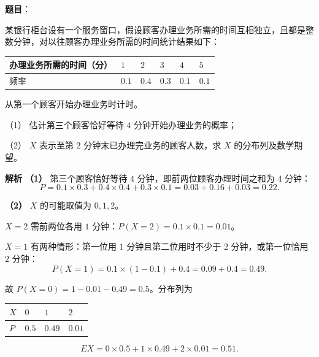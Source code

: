 \begin{answer}

\textbf{题目}：

某银行柜台设有一个服务窗口，假设顾客办理业务所需的时间互相独立，且都是整数分钟，对以往顾客办理业务所需的时间统计结果如下：

\begin{center}
\begin{tabular}{llllll}
\toprule
办理业务所需的时间（分） & $1$ & $2$ & $3$ & $4$ & $5$ \\
\midrule
频率 & $0.1$ & $0.4$ & $0.3$ & $0.1$ & $0.1$ \\
\bottomrule
\end{tabular}
\end{center}

从第一个顾客开始办理业务时计时。

（1） 估计第三个顾客恰好等待 $4$ 分钟开始办理业务的概率；

（2） $X$ 表示至第 $2$ 分钟末已办理完业务的顾客人数，求 $X$ 的分布列及数学期望。

\textbf{解析}
\textbf{（1）} 第三个顾客恰好等待 $4$ 分钟，即前两位顾客办理时间之和为 $4$ 分钟：
\nopagebreak[4]
\[P=0.1\times0.3+0.4\times0.4+0.3\times0.1=0.03+0.16+0.03=0.22.\]

\textbf{（2）} $X$ 的可能取值为 $0,1,2$。

$X=2$ 需前两位各用 $1$ 分钟：$P(X=2)=0.1\times0.1=0.01$。

$X=1$ 有两种情形：第一位用 $1$ 分钟且第二位用时不少于 $2$ 分钟，或第一位恰用 $2$ 分钟：
\nopagebreak[4]
\[P(X=1)=0.1\times(1-0.1)+0.4=0.09+0.4=0.49.\]

故 $P(X=0)=1-0.01-0.49=0.5$。分布列为

\begin{center}
\begin{tabular}{llll}
\toprule
$X$ & $0$ & $1$ & $2$ \\
\midrule
$P$ & $0.5$ & $0.49$ & $0.01$ \\
\bottomrule
\end{tabular}
\end{center}

\nopagebreak[4]
\[EX=0\times0.5+1\times0.49+2\times0.01=0.51.\]



\end{answer}
